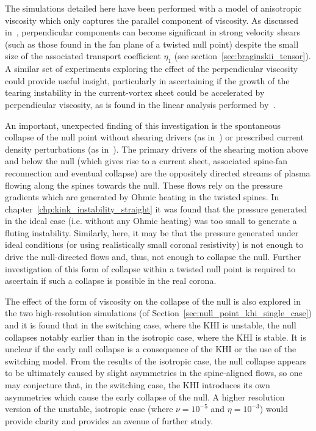 The simulations detailed here have been performed with a model of anisotropic viscosity which only captures the parallel component of viscosity. As discussed in~\cite{einaudiResistiveInstabilitiesFlowing1989}, perpendicular components can become significant in strong velocity shears (such as those found in the fan plane of a twisted null point) despite the small size of the associated transport coefficient $\eta_1$ (see section~\ref{sec:braginskii_tensor}). A similar set of experiments exploring the effect of the perpendicular viscosity could provide useful insight, particularly in ascertaining if the growth of the tearing instability in the current-vortex sheet could be accelerated by perpendicular viscosity, as is found in the linear analysis performed by~\cite{einaudiResistiveInstabilitiesFlowing1989}.

An important, unexpected finding of this investigation is the spontaneous collapse of the null point without shearing drivers (as in~\cite{pontinCurrentSheetFormation2007}) or prescribed current density perturbations (as in~\cite{thurgoodImplosiveCollapseMagnetic2018}). The primary drivers of the shearing motion above and below the null (which gives rise to a current sheet, associated spine-fan reconnection and eventual collapse) are the oppositely directed streams of plasma flowing along the spines towards the null. These flows rely on the pressure gradients which are generated by Ohmic heating in the twisted spines. In chapter~\ref{chp:kink_instability_straight} it was found that the pressure generated in the ideal case (i.e. without any Ohmic heating) was too small to generate a fluting instability. Similarly, here, it may be that the pressure generated under ideal conditions (or using realistically small coronal resistivity) is not enough to drive the null-directed flows and, thus, not enough to collapse the null. Further investigation of this form of collapse within a twisted null point is required to ascertain if such a collapse is possible in the real corona.

The effect of the form of viscosity on the collapse of the null is also explored in the two high-resolution simulations (of Section~\ref{sec:null_point_khi_single_case}) and it is found that in the switching case, where the KHI is unstable, the null collapses notably earlier than in the isotropic case, where the KHI is stable. It is unclear if the early null collapse is a consequence of the KHI or the use of the switching model. From the results of the isotropic case, the null collapse appears to be ultimately caused by slight asymmetries in the spine-aligned flows, so one may conjecture that, in the switching case, the KHI introduces its own asymmetries which cause the early collapse of the null. A higher resolution version of the unstable, isotropic case (where $\nu = 10^{-5}$ and $\eta=10^{-3}$) would provide clarity and provides an avenue of further study.

